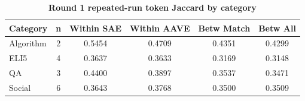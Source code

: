 \begin{table}[htbp]
\centering
\caption{\textbf{Round 1 repeated-run token Jaccard by category}}
\label{tab:round1-repeated-token-by-category}
\renewcommand{\arraystretch}{1.4}
\begin{tabular}{|l|c|c|c|c|c|}
\hline
\textbf{Category} & \textbf{n} & \textbf{Within SAE} & \textbf{Within AAVE} & \textbf{Betw Match} & \textbf{Betw All} \\
\hline
Algorithm & 2 & 0.5454 & 0.4709 & 0.4351 & 0.4299 \\
\hline
ELI5 & 4 & 0.3637 & 0.3633 & 0.3169 & 0.3148 \\
\hline
QA & 3 & 0.4400 & 0.3897 & 0.3537 & 0.3471 \\
\hline
Social & 6 & 0.3643 & 0.3768 & 0.3500 & 0.3509 \\
\hline
\end{tabular}
\end{table}
